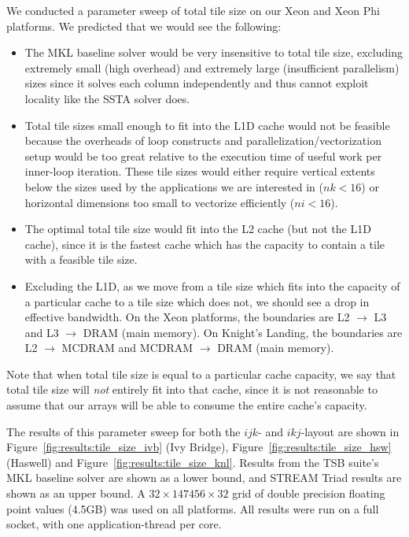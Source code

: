 \documentclass{sig-alternate-05-2015}
\begin{document}
We conducted a parameter sweep of total tile size on our Xeon and Xeon Phi 
  platforms.
We predicted that we would see the following: 
\begin{itemize}
\item The MKL baseline solver would be very insensitive to total tile size,
  excluding extremely small (high overhead) and extremely large (insufficient
  parallelism) sizes since it solves each column independently and thus cannot
  exploit locality like the SSTA solver does.
\item Total tile sizes small enough to fit into the L1D cache would not be feasible
  because the overheads of loop constructs and parallelization/vectorization
  setup would be too great relative to the execution time of useful work per
  inner-loop iteration.
These tile sizes would either require vertical extents below the sizes used
  by the applications we are interested in (\(nk < 16\)) or horizontal
  dimensions too small to vectorize efficiently (\(ni < 16\)).
\item The optimal total tile size would fit into the L2 cache (but not the L1D
  cache), since it is the fastest cache which has the capacity to contain a
  tile with a feasible tile size.
\item Excluding the L1D, as we move from a tile size which fits into the
  capacity of a particular cache to a tile size which does not, we should see a
  drop in effective bandwidth.
On the Xeon platforms, the boundaries are L2 \(\rightarrow\) L3 and L3
  \(\rightarrow\) DRAM (main memory).
On Knight's Landing, the boundaries are L2 \(\rightarrow\) MCDRAM and MCDRAM
  \(\rightarrow\) DRAM (main memory).
\end{itemize}
Note that when total tile size is equal to a particular cache capacity, we say
  that total tile size will \emph{not} entirely fit into that cache, since it is
  not reasonable to assume that our arrays will be able to consume the entire
  cache's capacity.

The results of this parameter sweep for both the \(ijk\)- and \(ikj\)-layout are
  shown in Figure~\ref{fig:results:tile_size_ivb} (Ivy Bridge),
  Figure~\ref{fig:results:tile_size_hsw} (Haswell) and
  Figure~\ref{fig:results:tile_size_knl}.
Results from the TSB suite's MKL baseline solver are shown as a lower bound,
  and STREAM Triad results are shown as an upper bound. 
A \(32 \times 147456 \times 32\) grid of double precision floating point values
  (4.5GB) was used on all platforms.
All results were run on a full socket, with one application-thread per core.
\end{document}
